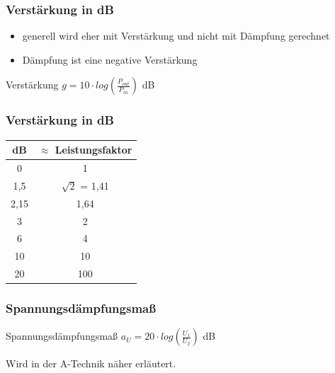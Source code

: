 \begin{frame}
\frametitle{Verstärkung in dB}
  \begin{itemize}
    \item generell wird eher mit Verstärkung und nicht mit Dämpfung gerechnet
    \item Dämpfung ist eine negative Verstärkung
  \end{itemize}
  \vspace{1cm}
  \begin{block}{Verstärkung}
    \Huge{$g = 10 \cdot log(\frac{P_{out}}{P_{in}})$ dB}
  \end{block}
\end{frame}

\begin{frame}
\frametitle{Verstärkung in dB}
\begin{center}
	\begin{Large}
	\begin{tabular}{|c|c|}
		\hline
		dB & $\approx$ Leistungsfaktor \\
		\hline \hline
		0    & 1                 \\ \hline
		1,5  & $\sqrt{2}$ = 1,41 \\ \hline
		2,15 & 1,64              \\ \hline
		3    & 2                 \\ \hline
		6    & 4                 \\ \hline
		10   & 10                \\ \hline
		20   & 100               \\ \hline
	\end{tabular}
	\end{Large}		
	\end{center}
\end{frame}

\begin{frame}
\frametitle{Spannungs\-dämpfungs\-maß}
  \begin{block}{Spannungsdämpfungsmaß}
      \Huge{$a_{U} = 20 \cdot log(\frac{U_{1}}{U_{2}})$ dB}
  \end{block}
\vspace{2cm}
Wird in der A-Technik näher erläutert.
\end{frame}

